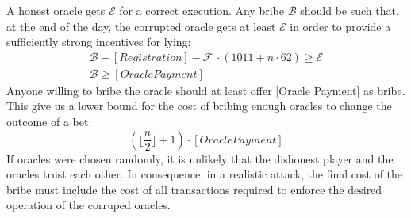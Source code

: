 A honest oracle gets $\mathcal{E}$ for a correct execution.
Any bribe $\mathcal{B}$ should be such that, at the end of the day, the
  corrupted oracle gets at least $\mathcal{E}$ in
  order to provide a sufficiently strong incentives for lying:
\begin{align}
  \mathcal{B} - [Registration] - \mathcal{F}\, \cdot (1011 + n \cdot 62) \geq \mathcal{E} \nonumber \\
  \mathcal{B} \geq [Oracle Payment]
\end{align}
Anyone willing to bribe the oracle should at least offer [Oracle Payment] as bribe.
This give us a lower bound for the cost of bribing enough oracles to change the
  outcome of a bet:
  \begin{equation}
   (\lfloor \frac{n}{2} \rfloor + 1) \cdot [Oracle Payment]
  \end{equation}
If oracles were chosen randomly, it is unlikely that the dishonest player and
  the oracles trust each other. In consequence, in a realistic attack, the final cost
  of the bribe must include the cost of all transactions required to enforce the desired
  operation of the corruped oracles.
